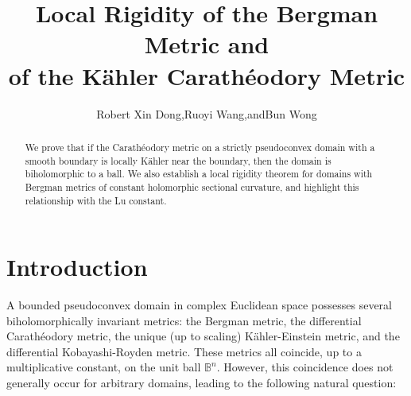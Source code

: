 \documentclass[12pt] {article}
\numberwithin{equation}{section}
\begin{document}
  

\title{\vspace{-1.2cm} \bf Local Rigidity of the Bergman Metric and\\ of the K\"ahler Carath\'eodory Metric} 

  


 

\author{Robert Xin Dong,\quad Ruoyi Wang,\quad and\quad Bun Wong}
\date{} 
\maketitle

\begin{abstract}
We prove that if the Carath\'eodory metric on a strictly pseudoconvex domain with a smooth boundary is
 locally K\"{a}hler near the boundary,  then the domain is biholomorphic to a ball. 
We also establish a local rigidity theorem for domains with Bergman metrics of constant holomorphic sectional curvature, and highlight this relationship with the Lu constant.


\end{abstract}

 

\renewcommand{\thefootnote}{\fnsymbol{footnote}}

\section{Introduction} 

 
A bounded pseudoconvex domain in complex Euclidean space possesses several biholomorphically invariant metrics: the Bergman metric, the differential Carath\'eodory metric, the unique (up to scaling) K\"ahler-Einstein metric, and the differential Kobayashi-Royden metric. These metrics all coincide, up to a multiplicative constant, on the unit ball $\mathbb{B}^n$. However, this coincidence does not generally occur for arbitrary domains, leading to the following natural question:
\end{document}
